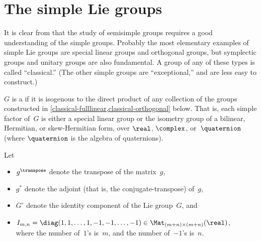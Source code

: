 \section{The simple Lie groups}

It is clear from  that the study of semisimple groups requires a good understanding of the simple groups.
Probably the most elementary examples of simple Lie groups are special linear groups and orthogonal groups, but symplectic groups and unitary groups are also fundamental. A group of any of these types is called ``classical\zz.'' (The other simple groups are ``exceptional\zz,'' and are less easy to construct.)

\begin{defn} \label{ClassicalDefn}
 $G$ is a  if it is isogenous to the
direct product of any collection of the groups constructed in
\cref{classical-fulllinear,classical-orthogonal} below. That is, each simple
factor of~$G$ is either a special linear group or the
isometry group of a bilinear, Hermitian, or skew-Hermitian form, over
$\real$, $\complex$, or~$\quaternion$ (where $\quaternion$
is the algebra of quaternions). 
 \end{defn}
 


\begin{notation}
Let
\noprelistbreak
 \begin{itemize}
 \item {}$g^\transpose$ denote the transpose of the
matrix~$g$, 
 \item $g^*$ denote the adjoint (that
is, the conjugate-transpose) of~$g$,
	\item $G^\circ$ denote the identity component of the Lie group~$G$,
	and

	 \item {}
	 $I_{m,n} = \diag(1,1,\ldots,1,-1,-1,\ldots,-1) \in \Mat_{(m+n)\times(m+n)}(\real)$, 
	 \\ %
	 where the number of~$1$'s is~$m$, and the number of~$-1$'s is~$n$.


 \end{itemize}
 \end{notation}

